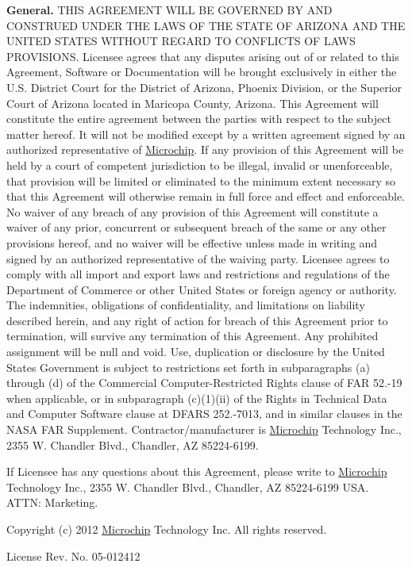 \begin{DoxyEnumerate}
\item {\bfseries General.} T\+H\+I\+S A\+G\+R\+E\+E\+M\+E\+N\+T W\+I\+L\+L B\+E G\+O\+V\+E\+R\+N\+E\+D B\+Y A\+N\+D C\+O\+N\+S\+T\+R\+U\+E\+D U\+N\+D\+E\+R T\+H\+E L\+A\+W\+S O\+F T\+H\+E S\+T\+A\+T\+E O\+F A\+R\+I\+Z\+O\+N\+A A\+N\+D T\+H\+E U\+N\+I\+T\+E\+D S\+T\+A\+T\+E\+S W\+I\+T\+H\+O\+U\+T R\+E\+G\+A\+R\+D T\+O C\+O\+N\+F\+L\+I\+C\+T\+S O\+F L\+A\+W\+S P\+R\+O\+V\+I\+S\+I\+O\+N\+S. Licensee agrees that any disputes arising out of or related to this Agreement, Software or Documentation will be brought exclusively in either the U.\+S. District Court for the District of Arizona, Phoenix Division, or the Superior Court of Arizona located in Maricopa County, Arizona. This Agreement will constitute the entire agreement between the parties with respect to the subject matter hereof. It will not be modified except by a written agreement signed by an authorized representative of \hyperlink{namespace_microchip}{Microchip}. If any provision of this Agreement will be held by a court of competent jurisdiction to be illegal, invalid or unenforceable, that provision will be limited or eliminated to the minimum extent necessary so that this Agreement will otherwise remain in full force and effect and enforceable. No waiver of any breach of any provision of this Agreement will constitute a waiver of any prior, concurrent or subsequent breach of the same or any other provisions hereof, and no waiver will be effective unless made in writing and signed by an authorized representative of the waiving party. Licensee agrees to comply with all import and export laws and restrictions and regulations of the Department of Commerce or other United States or foreign agency or authority. The indemnities, obligations of confidentiality, and limitations on liability described herein, and any right of action for breach of this Agreement prior to termination, will survive any termination of this Agreement. Any prohibited assignment will be null and void. Use, duplication or disclosure by the United States Government is subject to restrictions set forth in subparagraphs (a) through (d) of the Commercial Computer-\/\+Restricted Rights clause of F\+A\+R 52.-\/19 when applicable, or in subparagraph (c)(1)(ii) of the Rights in Technical Data and Computer Software clause at D\+F\+A\+R\+S 252.-\/7013, and in similar clauses in the N\+A\+S\+A F\+A\+R Supplement. Contractor/manufacturer is \hyperlink{namespace_microchip}{Microchip} Technology Inc., 2355 W. Chandler Blvd., Chandler, A\+Z 85224-\/6199. 
\end{DoxyEnumerate}

If Licensee has any questions about this Agreement, please write to \hyperlink{namespace_microchip}{Microchip} Technology Inc., 2355 W. Chandler Blvd., Chandler, A\+Z 85224-\/6199 U\+S\+A. A\+T\+T\+N\+: Marketing.

Copyright (c) 2012 \hyperlink{namespace_microchip}{Microchip} Technology Inc. All rights reserved.

License Rev. No. 05-\/012412 